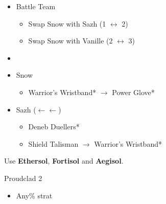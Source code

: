 \begin{menu}
	\begin{itemize}
		\paradigm
		\begin{itemize}
			\item Battle Team
				\begin{itemize}
					\item Swap Snow with Sazh (1 $\leftrightarrow$ 2)
					\item Swap Snow with Vanille (2 $\leftrightarrow$ 3)
				\end{itemize}
			\item {}%
				{\paradigmline{(\rav)}{(\com)}{\com}}%
				{\paradigmline[4]{\com}{\com}{\com}}%
				{\paradigmline{(\rav)}{(\rav)}{\sen}}%
				{\paradigmline{(\com)}{\med}{(\com)}}%
				{\paradigmline{\rav}{(\rav)}{(\com)}}%
				{\paradigmline{\rav}{\rav}{\rav}}%
		\end{itemize}
		\equip
		\begin{itemize}
			\item Snow
				\begin{itemize}
					\item Warrior's Wristband* $\rightarrow$ Power Glove*
				\end{itemize}
			\item Sazh ($\leftarrow\leftarrow$)
				\begin{itemize}
					\item Deneb Duellers*
					\item Shield Talisman $\rightarrow$ Warrior's Wristband*
				\end{itemize}
		\end{itemize}
	\end{itemize}
\end{menu}

Use \textbf{Ethersol}, \textbf{Fortisol} and \textbf{Aegisol}.

\begin{battle}{Proudclad 2}
	\begin{itemize}
		\item Any\% strat
	\end{itemize}
\end{battle}